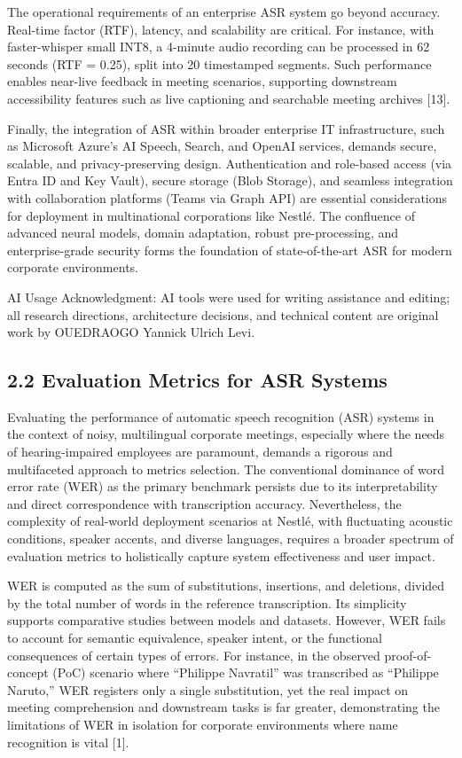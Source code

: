 \documentclass[12pt,a4paper]{article}
\begin{document}
The operational requirements of an enterprise ASR system go beyond accuracy. Real-time factor (RTF), latency, and scalability are critical. For instance, with faster-whisper small INT8, a 4-minute audio recording can be processed in 62 seconds (RTF = 0.25), split into 20 timestamped segments. Such performance enables near-live feedback in meeting scenarios, supporting downstream accessibility features such as live captioning and searchable meeting archives [13].


Finally, the integration of ASR within broader enterprise IT infrastructure, such as Microsoft Azure’s AI Speech, Search, and OpenAI services, demands secure, scalable, and privacy-preserving design. Authentication and role-based access (via Entra ID and Key Vault), secure storage (Blob Storage), and seamless integration with collaboration platforms (Teams via Graph API) are essential considerations for deployment in multinational corporations like Nestlé. The confluence of advanced neural models, domain adaptation, robust pre-processing, and enterprise-grade security forms the foundation of state-of-the-art ASR for modern corporate environments.


AI Usage Acknowledgment: AI tools were used for writing assistance and editing; all research directions, architecture decisions, and technical content are original work by OUEDRAOGO Yannick Ulrich Levi.


\subsection{2.2 Evaluation Metrics for ASR Systems}


Evaluating the performance of automatic speech recognition (ASR) systems in the context of noisy, multilingual corporate meetings, especially where the needs of hearing-impaired employees are paramount, demands a rigorous and multifaceted approach to metrics selection. The conventional dominance of word error rate (WER) as the primary benchmark persists due to its interpretability and direct correspondence with transcription accuracy. Nevertheless, the complexity of real-world deployment scenarios at Nestlé, with fluctuating acoustic conditions, speaker accents, and diverse languages, requires a broader spectrum of evaluation metrics to holistically capture system effectiveness and user impact.


WER is computed as the sum of substitutions, insertions, and deletions, divided by the total number of words in the reference transcription. Its simplicity supports comparative studies between models and datasets. However, WER fails to account for semantic equivalence, speaker intent, or the functional consequences of certain types of errors. For instance, in the observed proof-of-concept (PoC) scenario where “Philippe Navratil” was transcribed as “Philippe Naruto,” WER registers only a single substitution, yet the real impact on meeting comprehension and downstream tasks is far greater, demonstrating the limitations of WER in isolation for corporate environments where name recognition is vital [1].
\end{document}
